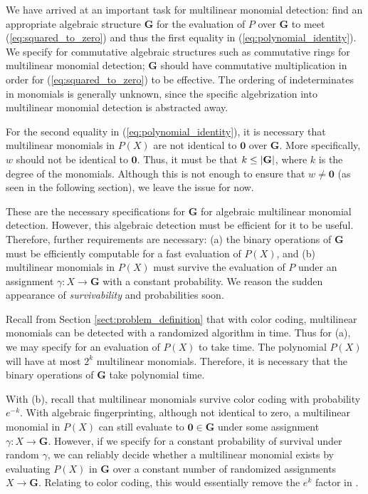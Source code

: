 We have arrived at an important task for multilinear monomial detection: 
find an appropriate algebraic structure $\mathbf{G}$ for 
the evaluation of $P$ over $\mathbf{G}$ to meet 
(\ref{eq:squared_to_zero}) and thus the first equality in (\ref{eq:polynomial_identity}). 
We specify for commutative algebraic structures such as 
commutative rings for multilinear monomial detection; 
$\mathbf{G}$ should have commutative multiplication in order for (\ref{eq:squared_to_zero}) 
to be effective. The ordering of indeterminates in monomials is generally unknown, 
since the specific algebrization into multilinear monomial detection 
is abstracted away. %

For the second equality in (\ref{eq:polynomial_identity}), it is necessary that multilinear 
monomials in $P(X)$ are not identical to $\mathbf{0}$ over $\mathbf{G}$. 
More specifically, 
$w$ should not be identical to $\mathbf{0}$. 
Thus, it must be that $k \leq {\left\vert\mathbf{G}\right\vert}$, where $k$ is the degree of the monomials. 
Although this is not enough to ensure that $w \neq \mathbf{0}$ (as seen in the following section), 
we leave the issue for now.

These are the necessary specifications for $\mathbf{G}$ for algebraic multilinear monomial detection. 
However, this algebraic detection must be efficient for it to be useful. 
Therefore, further requirements are necessary: (a) the binary operations of $\mathbf{G}$ 
must be efficiently computable %
for a fast evaluation of $P(X)$, and (b) multilinear monomials in $P(X)$ must 
survive the evaluation of $P$ under an assignment $\gamma \colon X \to \mathbf{G}$ 
with a constant probability. We reason the 
sudden appearance of \emph{survivability} and probabilities soon.

Recall from Section \ref{sect:problem_definition} 
that with color coding, multilinear monomials can be detected with a 
randomized algorithm in  time. Thus for (a), we may specify for 
an evaluation of $P(X)$ to take  time. The polynomial $P(X)$ 
will have at most $2^k$ multilinear monomials. Therefore, 
it is necessary that the binary operations 
of $\mathbf{G}$ take polynomial time.

With (b), recall that multilinear monomials 
survive color coding with probability $e^{-k}$. 
With algebraic fingerprinting, although not identical to zero, a multilinear monomial in $P(X)$ 
can still evaluate to $\mathbf{0} \in \mathbf{G}$ under some assignment $\gamma \colon X \to \mathbf{G}$. 
However, if we specify for a constant 
probability of survival under random $\gamma$, we can reliably decide whether a multilinear monomial exists 
by evaluating $P(X)$ in $\mathbf{G}$ over a constant number of 
randomized assignments $X \to \mathbf{G}$. Relating to color coding, 
this would essentially remove the 
$e^k$ factor in .

